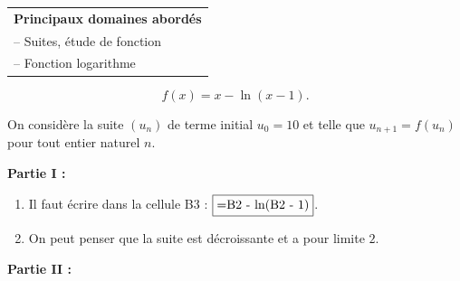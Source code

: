 \medskip

\begin{tabular}{|l|}\hline
\textbf{Principaux domaines abordés}\\
-- Suites, étude de fonction\\
-- Fonction logarithme\\ \hline
\end{tabular}

\medskip



\[f(x) = x - \ln (x - 1).\]

On considère la suite $\left(u_n\right)$ de terme initial $u_0 = 10$ et telle que $u_{n+1} = f\left(u_n\right)$ pour tout entier naturel $n$.

\bigskip

\textbf{Partie I :}

\medskip





















\begin{enumerate}
\item 
Il faut écrire dans la cellule B3 : $\fbox{=B2 - ln(B2 - 1)}$.
\item 
On peut penser que la suite est décroissante et a pour limite $2$.
\end{enumerate}

\bigskip

\textbf{Partie II :}

\medskip







